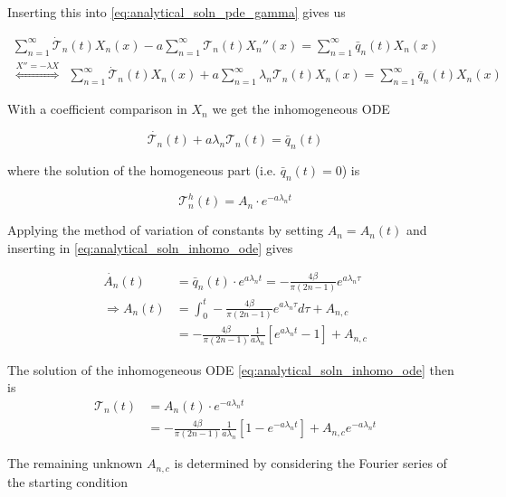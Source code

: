 \documentclass{scrartcl}[12pt, halfparskip]
\begin{document}
Inserting this into \eqref{eq:analytical_soln_pde_gamma} gives us

\begin{align*}
	\sum_{n=1}^{\infty} \dot{\mathcal{T}}_n(t) X_n(x) - a \sum_{n=1}^{\infty} \mathcal{T}_n(t) X_n''(x) = \sum_{n=1}^{\infty} \bar{q}_n(t) X_n(x) \nonumber \\
	\stackrel{X'' = - \lambda X}{\Leftrightarrow} \ \ \sum_{n=1}^{\infty} \dot{\mathcal{T}}_n(t) X_n(x) + a \sum_{n=1}^{\infty} \lambda_n \mathcal{T}_n(t) X_n(x) = \sum_{n=1}^{\infty} \bar{q}_n(t) X_n(x)
\end{align*}

With a coefficient comparison in $X_n$ we get the inhomogeneous ODE

\begin{equation}
	\dot{\mathcal{T}_n}(t) + a \lambda_n \mathcal{T}_n(t) = \bar{q}_n(t)
	\label{eq:analytical_soln_inhomo_ode}
\end{equation}

where the solution of the homogeneous part (i.e. $\bar{q}_n(t) = 0$) is

\begin{equation}
	\mathcal{T}_n^h(t) = A_n \cdot e^{-a \lambda_n t}
\end{equation}

Applying the method of variation of constants by setting $A_n = A_n(t)$ and inserting in \eqref{eq:analytical_soln_inhomo_ode} gives

\begin{align}
	\dot{A_n}(t) & = \bar{q}_n(t) \cdot e^{a \lambda_n t} = -\frac{4 \beta}{\pi (2n - 1)} e^{a \lambda_n \tau} \\
	\Rightarrow A_n(t) & = \int_{0}^{t} -\frac{4 \beta}{\pi (2n - 1)} e^{a \lambda_n \tau} d \tau + A_{n,c} \\
	& = -\frac{4 \beta}{\pi (2n - 1)} \frac{1}{a \lambda_n} \left[ e^{a \lambda_n t} - 1 \right] + A_{n,c}
\end{align}

The solution of the inhomogeneous ODE \eqref{eq:analytical_soln_inhomo_ode} then is
\begin{align}
	\mathcal{T}_n(t) & = A_n(t) \cdot e^{-a \lambda_n t}  \\
	& = -\frac{4 \beta}{\pi (2n - 1)} \frac{1}{a \lambda_n} \left[1 - e^{-a \lambda_n t} \right] + A_{n,c} e^{- a \lambda_n t} \nonumber
\end{align}

The remaining unknown $A_{n,c}$ is determined by considering the Fourier series of the starting condition
\end{document}
